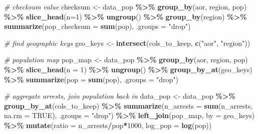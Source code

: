 \documentclass[
]{article}
\newenvironment{Shaded}{\begin{snugshade}}{\end{snugshade}}
\newcommand{\AttributeTok}[1]{\textcolor[rgb]{0.13,0.29,0.53}{#1}}
\newcommand{\CommentTok}[1]{\textcolor[rgb]{0.56,0.35,0.01}{\textit{#1}}}
\newcommand{\ConstantTok}[1]{\textcolor[rgb]{0.56,0.35,0.01}{#1}}
\newcommand{\DecValTok}[1]{\textcolor[rgb]{0.00,0.00,0.81}{#1}}
\newcommand{\FunctionTok}[1]{\textcolor[rgb]{0.13,0.29,0.53}{\textbf{#1}}}
\newcommand{\NormalTok}[1]{#1}
\newcommand{\OtherTok}[1]{\textcolor[rgb]{0.56,0.35,0.01}{#1}}
\newcommand{\SpecialCharTok}[1]{\textcolor[rgb]{0.81,0.36,0.00}{\textbf{#1}}}
\newcommand{\StringTok}[1]{\textcolor[rgb]{0.31,0.60,0.02}{#1}}
\begin{document}
\begin{Shaded}
\begin{Highlighting}[]
  \CommentTok{\# checksum value}
\NormalTok{  checksum }\OtherTok{\textless{}{-}}\NormalTok{ data\_pop }\SpecialCharTok{\%\textgreater{}\%}
    \FunctionTok{group\_by}\NormalTok{(aor, region, pop) }\SpecialCharTok{\%\textgreater{}\%}
    \FunctionTok{slice\_head}\NormalTok{(}\AttributeTok{n=}\DecValTok{1}\NormalTok{) }\SpecialCharTok{\%\textgreater{}\%}
    \FunctionTok{ungroup}\NormalTok{() }\SpecialCharTok{\%\textgreater{}\%}
    \FunctionTok{group\_by}\NormalTok{(region) }\SpecialCharTok{\%\textgreater{}\%}
    \FunctionTok{summarize}\NormalTok{(}\AttributeTok{pop\_checksum =} \FunctionTok{sum}\NormalTok{(pop), }\AttributeTok{.groups =} \StringTok{"drop"}\NormalTok{)}
  
  \CommentTok{\# find geographic keys}
\NormalTok{  geo\_keys }\OtherTok{\textless{}{-}} \FunctionTok{intersect}\NormalTok{(cols\_to\_keep, }\FunctionTok{c}\NormalTok{(}\StringTok{"aor"}\NormalTok{, }\StringTok{"region"}\NormalTok{))}
  
  \CommentTok{\# population map}
\NormalTok{  pop\_map }\OtherTok{\textless{}{-}}\NormalTok{ data\_pop }\SpecialCharTok{\%\textgreater{}\%}
    \FunctionTok{group\_by}\NormalTok{(aor, region, pop) }\SpecialCharTok{\%\textgreater{}\%}
    \FunctionTok{slice\_head}\NormalTok{(}\AttributeTok{n =} \DecValTok{1}\NormalTok{) }\SpecialCharTok{\%\textgreater{}\%}
    \FunctionTok{ungroup}\NormalTok{() }\SpecialCharTok{\%\textgreater{}\%}
    \FunctionTok{group\_by\_at}\NormalTok{(geo\_keys) }\SpecialCharTok{\%\textgreater{}\%}
    \FunctionTok{summarize}\NormalTok{(}\AttributeTok{pop =} \FunctionTok{sum}\NormalTok{(pop), }\AttributeTok{.groups =} \StringTok{"drop"}\NormalTok{)}
  
  \CommentTok{\# aggregate arrests, join population back in}
\NormalTok{  data\_pop }\OtherTok{\textless{}{-}}\NormalTok{ data\_pop }\SpecialCharTok{\%\textgreater{}\%}
    \FunctionTok{group\_by\_at}\NormalTok{(cols\_to\_keep) }\SpecialCharTok{\%\textgreater{}\%}
    \FunctionTok{summarize}\NormalTok{(}\AttributeTok{n\_arrests =} \FunctionTok{sum}\NormalTok{(n\_arrests, }\AttributeTok{na.rm =} \ConstantTok{TRUE}\NormalTok{), }\AttributeTok{.groups =} \StringTok{"drop"}\NormalTok{) }\SpecialCharTok{\%\textgreater{}\%}
    \FunctionTok{left\_join}\NormalTok{(pop\_map, }\AttributeTok{by =}\NormalTok{ geo\_keys) }\SpecialCharTok{\%\textgreater{}\%}
    \FunctionTok{mutate}\NormalTok{(}\AttributeTok{ratio =}\NormalTok{ n\_arrests}\SpecialCharTok{/}\NormalTok{pop}\SpecialCharTok{*}\DecValTok{1000}\NormalTok{,}
           \AttributeTok{log\_pop =} \FunctionTok{log}\NormalTok{(pop))}
  

\end{Highlighting}
\end{Shaded}
\end{document}

